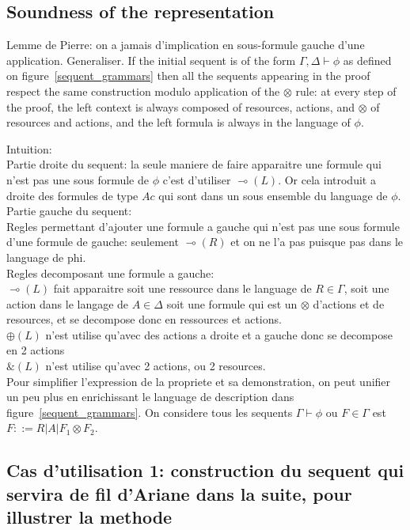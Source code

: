\documentclass[runningheads,a4paper]{llncs}
\begin{document}
\subsection{Soundness of the representation}
Lemme de Pierre: on a jamais d'implication en sous-formule gauche d'une application. Generaliser.
If the initial sequent is of the form $\Gamma , \Delta \vdash \phi$ as defined on figure~\ref{sequent_grammars} then all the sequents appearing in the proof respect the same construction modulo application of the $\otimes$ rule: at every step of the proof, the left context is always composed of resources, actions, and $\otimes$ of resources and actions, and the left formula is always in the language of $\phi$.

Intuition:\\
Partie droite du sequent: la seule maniere de faire apparaitre une formule qui n'est pas une sous formule de $\phi$ c'est d'utiliser $\multimap(L)$. Or cela introduit a droite des formules de type $Ac$ qui sont dans un sous ensemble du language de $\phi$.\\
Partie gauche du sequent:\\
Regles permettant d'ajouter une formule a gauche qui n'est pas une sous formule d'une formule de gauche: seulement  $\multimap(R)$ et on ne l'a pas puisque pas dans le language de phi.\\
Regles decomposant une formule a gauche:\\
$\multimap(L)$ fait apparaitre soit une ressource dans le language de $R \in \Gamma$, soit une action dans le langage de $A\in\Delta$ soit une formule qui est un $\otimes$ d'actions et de resources, et se decompose donc en ressources et actions.\\
$\oplus(L)$ n'est utilise qu'avec des actions a droite et a gauche donc se decompose en 2 actions\\
$\&(L)$ n'est utilise qu'avec 2 actions, ou 2 resources.\\

Pour simplifier l'expression de la propriete et sa demonstration, on peut unifier un peu plus en enrichissant le language de description dans figure~\ref{sequent_grammars}. On considere tous les sequents $\Gamma \vdash \phi$ ou $F\in\Gamma$ est $F::= R|A| F_{1}\otimes F_{2}$.
\subsection{Cas d'utilisation 1: construction du sequent qui servira de fil d'Ariane dans la suite, pour illustrer la methode}
\end{document}
